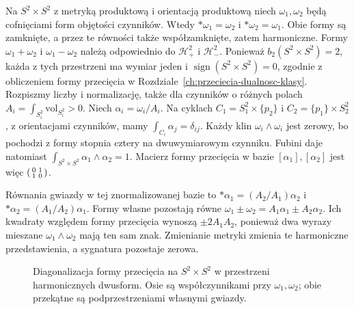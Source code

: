 \begin{przyklad}
\label{prz:hodge-dwie-sfery-18}
Na $S^2\times S^2$ z metryką produktową i orientacją
produktową niech $\omega_1,\omega_2$ będą cofnięciami
form objętości czynników. Wtedy $*\omega_1=\omega_2$
i $*\omega_2=\omega_1$. Obie formy są zamknięte,
a przez te równości także współzamknięte, zatem harmoniczne.
Formy $\omega_1+\omega_2$ i $\omega_1-\omega_2$ należą
odpowiednio do $\mathcal H^2_+$ i $\mathcal H^2_-$.
Ponieważ $b_2(S^2\times S^2)=2$, każda z tych przestrzeni
ma wymiar jeden i $\operatorname{sign}(S^2\times S^2)=0$,
zgodnie z obliczeniem formy przecięcia w
Rozdziale~\ref{ch:przeciecia-dualnosc-klasy}.
Rozpiszmy liczby i normalizację, także dla czynników
o różnych polach $A_i=\int_{S_i^2}\mathrm{vol}_{S_i^2}>0$.
Niech $\alpha_i=\omega_i/A_i$.
Na cyklach $C_1=S_1^2\times\{p_2\}$ i
$C_2=\{p_1\}\times S_2^2$, z orientacjami czynników,
mamy $\int_{C_i}\alpha_j=\delta_{ij}$.
Każdy klin $\omega_i\wedge\omega_i$ jest zerowy,
bo pochodzi z formy stopnia cztery na dwuwymiarowym czynniku.
Fubini daje natomiast
$\int_{S^2\times S^2}\alpha_1\wedge\alpha_2=1$.
Macierz formy przecięcia w bazie $[\alpha_1],[\alpha_2]$
jest więc $\begin{psmallmatrix}0&1\\1&0\end{psmallmatrix}$.

Równania gwiazdy w tej znormalizowanej bazie to
$*\alpha_1=(A_2/A_1)\alpha_2$ i
$*\alpha_2=(A_1/A_2)\alpha_1$.
Formy własne pozostają równe
$\omega_1\pm\omega_2=A_1\alpha_1\pm A_2\alpha_2$.
Ich kwadraty względem formy przecięcia wynoszą
$\pm2A_1A_2$, ponieważ dwa wyrazy mieszane
$\omega_1\wedge\omega_2$ mają ten sam znak.
Zmienianie metryki zmienia te harmoniczne przedstawienia,
a sygnatura pozostaje zerowa.
\end{przyklad}

\begin{figure}[H]
\centering
{}
\caption{Diagonalizacja formy przecięcia na $S^2\times S^2$
w przestrzeni harmonicznych dwusform.
Osie są współczynnikami przy $\omega_1,\omega_2$;
obie przekątne są podprzestrzeniami własnymi gwiazdy.}
\label{fig:hodge-sygnatura-dwie-sfery}
\end{figure}

